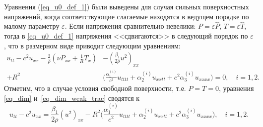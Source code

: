 \documentclass[12pt, a4paper]{report}
\begin{document}
Уравнения (\ref{eq_u0_def_1}) были выведены для случая сильных поверхностных напряжений, когда соответствующие слагаемые находятся в ведущем порядке по малому параметру $\varepsilon$. Если напряжения сравнительно невелики:
$P = \varepsilon \hat P$, $T = \varepsilon \hat T$,
тогда в \eqref{eq_u0_def_1} напряжения <<сдвигаются>> в следующий порядок по $\varepsilon$, что в размерном виде приводит следующим уравнениям:
\begin{equation}\label{eq_dim_weak_trac}
\begin{split}
u_{tt} - c^2 u_{xx} - \frac{2}{\rho}\left(\nu P_{xx} + \frac1R T_x\right)  &- \left(\frac{\beta_1}{2\rho} u^2 \right)_{xx} \\
+ R^2& \bigg(\frac{\alpha_1^{(i)}}{c^2} u_{tttt} + \alpha_2^{(i)} u_{xxtt} + c^2\alpha_3^{(i)} u_{xxxx}  \bigg) = 0, \quad i = 1,2.
\end{split}
\end{equation}
Отметим, что в случае условия свободной поверхности, т.е. $P = T = 0$, уравнения \eqref{eq_dim} и~\eqref{eq_dim_weak_trac} сводятся к
\begin{equation}\label{eq_dim_free_surf}
u_{tt} - c^2 u_{xx} = \frac{\beta_1}{2\rho}\left(u^2\right)_{xx} -  R^2 \bigg(\frac{\alpha_1^{(i)}}{c^2} u_{tttt} + \alpha_2^{(i)} u_{xxtt} + c^2\alpha_3^{(i)} u_{xxxx}\bigg), \quad i = 1,2.
\end{equation}
\end{document}
